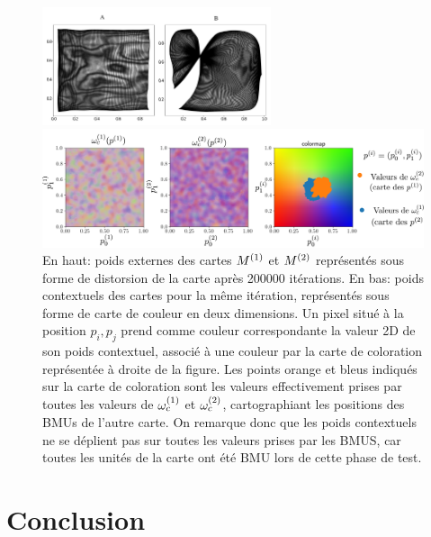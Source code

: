 \documentclass[../main]{subfiles}
\begin{document}
\begin{figure}
	\begin{minipage}{\textwidth}
		\centering\includegraphics[width=0.6\textwidth]{we_cub_example.pdf}
	\end{minipage}
	\begin{minipage}{\textwidth}
		\includegraphics[width=\textwidth]{wc_cub_legend.pdf}
		\caption{En haut: poids externes des cartes $M^{({1})}$ et $M^{({2})}$ représentés sous forme de distorsion de la carte après 200000 itérations.
	En bas: poids contextuels des cartes pour la même itération, représentés sous forme de carte de couleur en deux dimensions. Un pixel situé à la position $p_i,p_j$ prend comme couleur correspondante la valeur 2D de son poids contextuel, associé à une couleur par la carte de coloration représentée à droite de la figure.
	Les points orange et bleus indiqués sur la carte de coloration sont les valeurs effectivement prises par toutes les valeurs de $\omega_c^{(1)}$ et $\omega_c^{(2)}$, cartographiant les positions des BMUs de l'autre carte.
	On remarque donc que les poids contextuels ne se déplient pas sur toutes les valeurs prises par les BMUS, car toutes les unités de la carte ont été BMU lors de cette phase de test.\label{fig:2som_cub_wc}}
	\end{minipage}
\end{figure}


\section{Conclusion}
\end{document}
